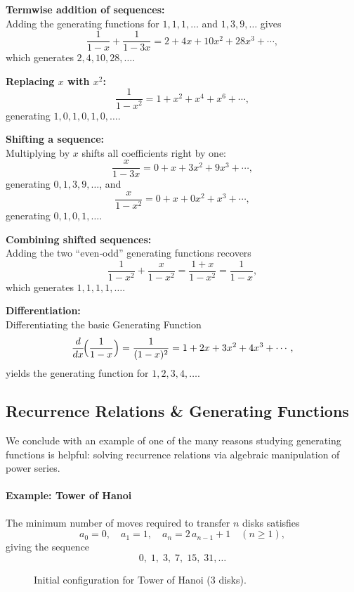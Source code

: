 \documentclass{article}
\begin{document}
\medskip
\noindent
\textbf{Termwise addition of sequences:}\\
Adding the generating functions for \(1,1,1,\dots\) and \(1,3,9,\dots\) gives
\[
\frac{1}{1-x} + \frac{1}{1-3x}
= 2 + 4x + 10x^2 + 28x^3 + \cdots,
\]
which generates \(2,4,10,28,\dots\).

\medskip
\noindent
\textbf{Replacing \(x\) with \(x^2\):}
\[
\frac{1}{1-x^2} = 1 + x^2 + x^4 + x^6 + \cdots,
\]
generating \(1,0,1,0,1,0,\dots\).

\medskip
\noindent
\textbf{Shifting a sequence:}\\
Multiplying by \(x\) shifts all coefficients right by one:
\[
\frac{x}{1-3x} = 0 + x + 3x^2 + 9x^3 + \cdots,
\]
generating \(0,1,3,9,\dots\), and
\[
\frac{x}{1-x^2} = 0 + x + 0x^2 + x^3 + \cdots,
\]
generating \(0,1,0,1,\dots\).

\medskip
\noindent
\textbf{Combining shifted sequences:}\\
Adding the two “even‑odd” generating functions recovers
\[
\frac{1}{1-x^2} + \frac{x}{1-x^2} = \frac{1+x}{1-x^2} = \frac{1}{1-x},
\]
which generates \(1,1,1,1,\dots\).

\medskip
\noindent
\textbf{Differentiation:}\\
Differentiating the basic Generating Function
\[
\frac{d}{dx}\!\Bigl(\frac{1}{1-x}\Bigr)
= \frac{1}{(1-x)^2}
= 1 + 2x + 3x^2 + 4x^3 + \cdots,
\]
yields the generating function for \(1,2,3,4,\dots\).


\medskip

\FloatBarrier            %

\subsection*{Recurrence Relations \& Generating Functions}

We conclude with an example of one of the many reasons studying generating functions is helpful: solving recurrence relations via algebraic manipulation of power series.

\paragraph{Example: Tower of Hanoi}  
The minimum number of moves required to transfer \(n\) disks satisfies
\[
a_0 = 0,\quad
a_1 = 1,\quad
a_n = 2\,a_{n-1} + 1 \quad(n\ge1),
\]
giving the sequence
\[
0,\;1,\;3,\;7,\;15,\;31,\dots
\]

\begin{figure}[ht]
  \centering
  \caption{Initial configuration for Tower of Hanoi (3 disks).}
\end{figure}
\end{document}
